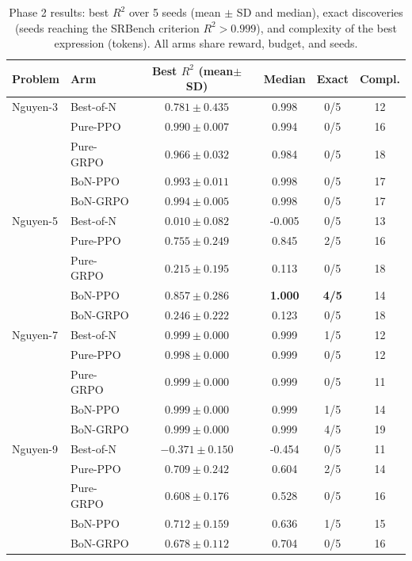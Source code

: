 \begin{table}[htbp]
    \centering
    \caption[Phase 2 master results]{Phase 2 results: best $R^2$ over 5 seeds (mean $\pm$ SD and median), exact discoveries (seeds reaching the SRBench criterion $R^2 > 0.999$), and complexity of the best expression (tokens). All arms share reward, budget, and seeds.}
    \label{tab:phase2_master}
    \small
    \begin{tabular}{llcccc}
    \toprule
    \textbf{Problem} & \textbf{Arm} & \textbf{Best $R^2$ (mean$\pm$SD)} & \textbf{Median} & \textbf{Exact} & \textbf{Compl.} \\
    \midrule
    Nguyen-3 & Best-of-N & $0.781 \pm 0.435$ & 0.998 & 0/5 & 12 \\
             & Pure-PPO  & $0.990 \pm 0.007$ & 0.994 & 0/5 & 16 \\
             & Pure-GRPO & $0.966 \pm 0.032$ & 0.984 & 0/5 & 18 \\
             & BoN-PPO   & $0.993 \pm 0.011$ & 0.998 & 0/5 & 17 \\
             & BoN-GRPO  & $0.994 \pm 0.005$ & 0.998 & 0/5 & 17 \\
    \midrule
    Nguyen-5 & Best-of-N & $0.010 \pm 0.082$ & -0.005 & 0/5 & 13 \\
             & Pure-PPO  & $0.755 \pm 0.249$ & 0.845 & 2/5 & 16 \\
             & Pure-GRPO & $0.215 \pm 0.195$ & 0.113 & 0/5 & 18 \\
             & BoN-PPO   & $\mathbf{0.857 \pm 0.286}$ & \textbf{1.000} & \textbf{4/5} & 14 \\
             & BoN-GRPO  & $0.246 \pm 0.222$ & 0.123 & 0/5 & 18 \\
    \midrule
    Nguyen-7 & Best-of-N & $0.999 \pm 0.000$ & 0.999 & 1/5 & 12 \\
             & Pure-PPO  & $0.998 \pm 0.000$ & 0.999 & 0/5 & 12 \\
             & Pure-GRPO & $0.999 \pm 0.000$ & 0.999 & 0/5 & 11 \\
             & BoN-PPO   & $0.999 \pm 0.000$ & 0.999 & 1/5 & 14 \\
             & BoN-GRPO  & $0.999 \pm 0.000$ & 0.999 & 4/5 & 19 \\
    \midrule
    Nguyen-9 & Best-of-N & $-0.371 \pm 0.150$ & -0.454 & 0/5 & 11 \\
             & Pure-PPO  & $0.709 \pm 0.242$ & 0.604 & 2/5 & 14 \\
             & Pure-GRPO & $0.608 \pm 0.176$ & 0.528 & 0/5 & 16 \\
             & BoN-PPO   & $\mathbf{0.712 \pm 0.159}$ & 0.636 & 1/5 & 15 \\
             & BoN-GRPO  & $0.678 \pm 0.112$ & 0.704 & 0/5 & 16 \\
    \bottomrule
    \end{tabular}
\end{table}

